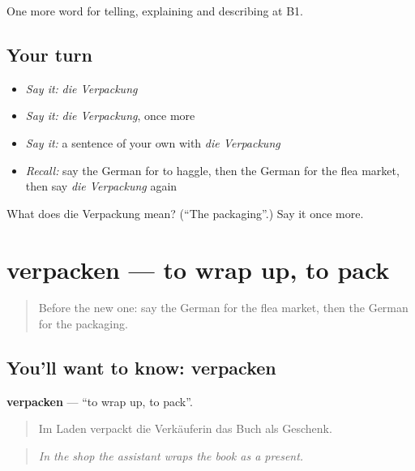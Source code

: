 \begin{grammarlens}[title={What you've built}]
One more word for telling, explaining and describing at B1.
\end{grammarlens}

\subsection*{Your turn}
\begin{itemize}
\raggedright
  \item \emph{Say it:} \emph{die Verpackung}
  \item \emph{Say it:} \emph{die Verpackung}, once more
  \item \emph{Say it:} a sentence of your own with \emph{die Verpackung}
  \item \emph{Recall:} say the German for to haggle, then the German for the flea market, then say \emph{die Verpackung} again
\end{itemize}

\begin{tcolorbox}[breakable,colback=teal!4,colframe=teal!35!black,title={Before you move on}]
What does die Verpackung mean? (\textquotedblleft{}The packaging\textquotedblright{}.) Say it once more.
\end{tcolorbox}
\section[verpacken]{verpacken — to wrap up, to pack}

\label{lesson:GE-C452-verpacken}



\begin{quote}
Before the new one: say the German for the flea market, then the German for the packaging.
\end{quote}

\subsection*{You'll want to know: verpacken}
\textbf{verpacken} — \textquotedblleft{}to wrap up, to pack\textquotedblright{}.

\begin{quote}
Im Laden verpackt die Verkäuferin das Buch als Geschenk.
\end{quote}

\begin{quote}
\emph{In the shop the assistant wraps the book as a present.}
\end{quote}

